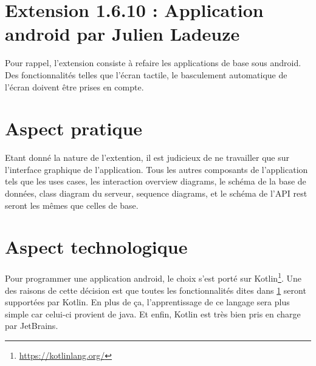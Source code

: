 \section{Extension 1.6.10 : Application android par Julien Ladeuze}\label{INTRODUCTION}
\begin{flushleft}
Pour rappel, l'extension consiste à refaire les applications de base sous android. Des fonctionnalités telles que l'écran tactile, le basculement automatique de l'écran doivent être prises en compte.
\end{flushleft}
\section{Aspect pratique}
\begin{flushleft}
Etant donné la nature de l'extention, il est judicieux de ne travailler que sur l'interface graphique de l'application. Tous les autres composants de l'application tels que les uses cases, les interaction overview diagrams, le schéma de la base de données, class diagram du serveur, sequence diagrams, et le schéma de l'API rest seront les mêmes que celles de base.
\end{flushleft}
\section{Aspect technologique}
\begin{flushleft}
Pour programmer une application android, le choix s'est porté sur Kotlin\footnote{\url{https://kotlinlang.org/}}. Une des raisons de cette décision est que toutes les fonctionnalités dites dans \ref{INTRODUCTION} seront supportées par Kotlin. En plus de ça, l'apprentissage de ce langage sera plus simple car celui-ci provient de java. Et enfin, Kotlin est très bien pris en charge par JetBrains.
\end{flushleft}
